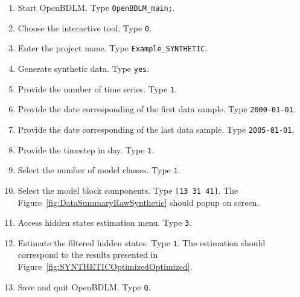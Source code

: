 \begin{enumerate}
\item Start OpenBDLM. Type \colorbox{light-gray}{\lstinline[basicstyle = \mlttfamily \small, backgroundcolor = \color{light-gray}]!OpenBDLM_main;!}.
\item Choose the interactive tool. Type \colorbox{light-gray}{\lstinline[basicstyle = \mlttfamily \small, backgroundcolor = \color{light-gray}]!0!}.
\item Enter the project name. Type \colorbox{light-gray}{\lstinline[basicstyle = \mlttfamily \small, backgroundcolor = \color{light-gray}]!Example_SYNTHETIC!}. 
\item Generate synthetic data. Type \colorbox{light-gray}{\lstinline[basicstyle = \mlttfamily \small, backgroundcolor = \color{light-gray}]!yes!}. 
\item Provide the number of time series. Type \colorbox{light-gray}{\lstinline[basicstyle = \mlttfamily \small, backgroundcolor = \color{light-gray}]!1!}.
\item Provide  the date corresponding of the first data sample. Type \colorbox{light-gray}{\lstinline[basicstyle = \mlttfamily \small, backgroundcolor = \color{light-gray}]!2000-01-01!}.
\item Provide  the date corresponding of the last data sample. Type \colorbox{light-gray}{\lstinline[basicstyle = \mlttfamily \small, backgroundcolor = \color{light-gray}]!2005-01-01!}.
\item Provide  the timestep in day. Type \colorbox{light-gray}{\lstinline[basicstyle = \mlttfamily \small, backgroundcolor = \color{light-gray}]!1!}.
\item Select the number of model classes. Type \colorbox{light-gray}{\lstinline[basicstyle = \mlttfamily \small, backgroundcolor = \color{light-gray}]!1!}. 
\item Select the model block components. Type \colorbox{light-gray}{\lstinline[basicstyle = \mlttfamily \small, backgroundcolor = \color{light-gray}]![13 31 41]!}. The Figure~\ref{fig:DataSummaryRawSynthetic} should popup on screen.
\item Access hidden states estimation menu. Type \colorbox{light-gray}{\lstinline[basicstyle = \mlttfamily \small, backgroundcolor = \color{light-gray}]!3!}. 
\item Estimate the filtered hidden states. Type \colorbox{light-gray}{\lstinline[basicstyle = \mlttfamily \small, backgroundcolor = \color{light-gray}]!1!}. The estimation should correspond to the results presented in Figure~\ref{fig:SYNTHETICOptimizedOptimized}.
\item Save and quit OpenBDLM. Type \colorbox{light-gray}{\lstinline[basicstyle = \mlttfamily \small, backgroundcolor = \color{light-gray}]!Q!}.
\end{enumerate}



